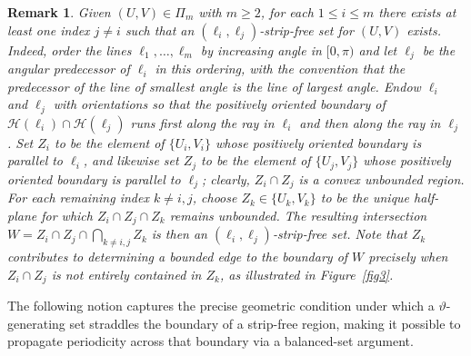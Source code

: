 \documentclass[12pt]{amsart}
\numberwithin{equation}{section}
\newtheorem{remark}[theorem]{Remark}
\begin{document}
\begin{remark}\label{rem:strip-free-existence}
Given $(U,V) \in \Pi_m$ with $m \geq 2$, for each $1 \leq i \leq m$ there exists at least one index $ j \neq i $ such that an $(\pmb{\ell}_i,\pmb{\ell}_j)$-strip-free set for $(U,V)$ exists. Indeed, order the lines $ \ell_1, \dots, \ell_m $ by increasing angle in $[0, \pi)$ and let $ \ell_j $ be the angular predecessor of $\ell_i$ in this ordering, with the convention that the predecessor of the line of smallest angle is the line of largest angle. Endow $\ell_i$ and $\ell_j$ with orientations so that the positively oriented boundary of $ \mathcal H(\pmb{\ell}_i) \cap \mathcal H(\pmb{\ell}_j) $ runs first along the ray in $\ell_i$ and then along the ray in $\ell_j$. Set $Z_i $ to be the element of $ \{U_i, V_i\}$ whose positively oriented boundary is parallel to $\pmb{\ell}_i$, and likewise set $Z_j $ to be the element of $ \{U_j, V_j\}$ whose positively oriented boundary is parallel to $\pmb{\ell}_j$; clearly, $ Z_i \cap Z_j $ is a convex unbounded region. For each remaining index $ k \neq i, j $, choose $ Z_k \in \{U_k, V_k\}$ to be the unique half-plane for which $ Z_i \cap Z_j \cap Z_k $ remains unbounded. The resulting intersection $ W = Z_i \cap Z_j \cap \bigcap_{k \neq i, j} Z_k $ is then an $(\pmb{\ell}_i,\pmb{\ell}_j)$-strip-free set.
Note that $ Z_k $ contributes to determining a bounded edge to the boundary of $ W $ precisely when $ Z_i \cap Z_j $ is not entirely contained in $ Z_k $, as illustrated in Figure~\ref{fig3}.
\end{remark}

The following notion captures the precise geometric condition under which a $\vartheta$-generating set  straddles the boundary of a strip-free region, making it possible to propagate periodicity across that boundary via a balanced-set argument.
\end{document}

